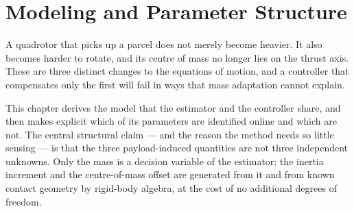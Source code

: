 
\providecommand{\dJ}{\Delta J}
\providecommand{\Jt}{J_t}
\providecommand{\Jb}{J_b}
\providecommand{\cvec}{\bm{c}}
\providecommand{\rp}{\bm{r}_p}
\providecommand{\rc}{\bm{r}_c}
\providecommand{\mpay}{\hat{m}_p}
\providecommand{\mb}{m_b}
\providecommand{\mt}{m_t}
\providecommand{\Tphys}{T_{\mathrm{phys}}}
\providecommand{\tauphys}{\bm{\tau}_{\mathrm{phys}}}
\providecommand{\tcom}{\bm{\tau}_{\mathrm{com}}}
\providecommand{\ev}{\bm{e}_3}

\chapter{Modeling and Parameter Structure}\label{ch:model}

A quadrotor that picks up a parcel does not merely become heavier. It
also becomes harder to rotate, and its centre of mass no longer lies on
the thrust axis. These are three distinct changes to the equations of
motion, and a controller that compensates only the first will fail in
ways that mass adaptation cannot explain.

This chapter derives the model that the estimator and the controller
share, and then makes explicit which of its parameters are identified
online and which are not. The central structural claim --- and the reason
the method needs so little sensing --- is that the three payload-induced
quantities are not three independent unknowns. Only the mass is a
decision variable of the estimator; the inertia increment and the
centre-of-mass offset are generated from it and from known contact
geometry by rigid-body algebra, at the cost of no additional degrees of
freedom.

